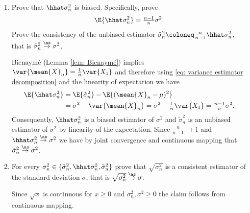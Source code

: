 \begin{exercise}
\begin{enumerate}[label=(\alph*),noitemsep]
        \item Prove that \(\hhat\sigma_n^2\) is biased. Specifically, prove
        \[
            \E{\hhat\sigma_n^2} = \tfrac{n-1}{n}\sigma^2.
        \]
        Prove the consistency of the unbiased estimator \(\tilde\sigma_n^2 \coloneq \tfrac{n}{n-1}\hhat\sigma_n^2\),
        that is \(\tilde\sigma_n^2 \overset{\as}\to \sigma^2\).
        \begin{solution}
            Bienaymé (Lemma \ref{lem: Bienaymé}) implies \(\var{\mean{X}_n} =
            \frac1n \var{X_1}\) and therefore using \eqref{eq: variance estimator decomposition}
            and the linearity of expectation we have
            \begin{align*}
                \E{\hhat\sigma_n^2}
                &= \E{\hat\sigma_n^2} - \E{(\mean{X}_n - \mu)^2}
                \\
                &= \sigma^2 - \var{\mean{X}_n}
                = \sigma^2 - \tfrac1n\var{X_1} = \tfrac{n-1}{n}\sigma^2.
            \end{align*}
            Consequently, \(\hhat\sigma_n^2\) is a biased estimator of
            \(\sigma^2\) and \(\tilde\sigma_n^2\) is an unbiased estimator of
            \(\sigma^2\) by linearity of the expectation.
            Since \(\frac{n}{n-1} \to 1\) and \(\hhat\sigma_n^2 \overset{\as}\to
            \sigma^2\) we have by joint convergence and continuous mapping that
            \(\tilde\sigma_n^2 \overset{\as}\to \sigma^2\).
        \end{solution}

        \item For every \(\sigma_n^2 \in \{\hat\sigma_n^2, \hhat\sigma_n^2,
        \tilde\sigma_n^2\}\) prove that \(\sqrt{\sigma_n^2}\) is a consistent
        estimator of the standard deviation \(\sigma\), that is 
        \(\sqrt{\sigma_n^2} \overset{\as}\to \sigma\).
        \begin{solution}
            Since \(\sqrt{x}\) is continuous for \(x \ge 0\) and \(\sigma_n^2,
            \sigma^2 \ge 0\) the claim follows from continuous mapping.
        \end{solution}
    \end{enumerate}
\end{exercise}

